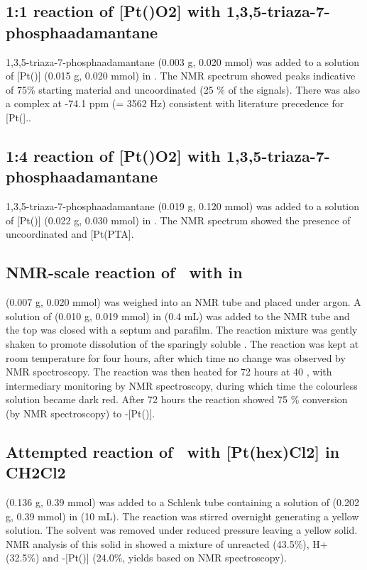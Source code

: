 \subsection*{1:1 reaction of [Pt(\tButhixantphos)O2] with 1,3,5-triaza-7-phosphaadamantane}

1,3,5-triaza-7-phosphaadamantane (0.003 g, 0.020 mmol) was added to a solution of [Pt(\tButhixantphos)] (0.015 g, 0.020 mmol) in .  The \phosphorus{} NMR spectrum showed peaks indicative of 75\% starting material and uncoordinated \tButhixantphos{} (25 \% of the \tButhixantphos{} signals).  There was also a complex at -74.1 ppm (\JPtP = 3562 Hz) consistent with literature precedence for [Pt(]..

\subsection*{1:4 reaction of [Pt(\tButhixantphos)O2] with 1,3,5-triaza-7-phosphaadamantane}

1,3,5-triaza-7-phosphaadamantane (0.019 g, 0.120 mmol) was added to a solution of [Pt(\tButhixantphos)] (0.022 g, 0.030 mmol) in .  The \phosphorus{} NMR spectrum showed the presence of uncoordinated \tButhixantphos{} and [Pt(PTA].  



\subsection*{NMR-scale reaction of \tButhixantphos\ with \ce{[Pt(hex)Cl2]} in }
\ce{[Pt(hex)Cl2]} (0.007 g, 0.020 mmol) was weighed into an NMR tube and placed under argon.  A solution of \tButhixantphos{} (0.010 g, 0.019 mmol) in  (0.4 mL) was added to the NMR tube and the top was closed with a septum and parafilm.  The reaction mixture was gently shaken to promote dissolution of the sparingly soluble \ce{[Pt(hex)Cl2]}.  The reaction was kept at room temperature for four hours, after which time no change was observed by NMR spectroscopy.  The reaction was then heated for 72 hours at 40 \degC, with intermediary monitoring by NMR spectroscopy, during which time the colourless solution became dark red.  After 72 hours the reaction showed 75 \% conversion (by \phosphorus{} NMR spectroscopy) to \trans-[Pt(\tBuxantphos)].

\subsection*{Attempted reaction of \tButhixantphos\ with [Pt(hex)Cl2] in CH2Cl2}
\ce{[Pt(hex)Cl2]} (0.136 g, 0.39 mmol) was added to a Schlenk tube containing a solution of  \tButhixantphos{} (0.202 g, 0.39 mmol) in  (10 mL).  The reaction was stirred overnight generating a yellow solution.  The solvent was removed under reduced pressure leaving a yellow solid.  NMR analysis of this solid in  showed a mixture of unreacted \tButhixantphos{} (43.5\%), \tButhixantphos H+ (32.5\%) and \trans-[Pt(\tButhixantphos)] (24.0\%, yields based on \phosphorus{} NMR spectroscopy).  

